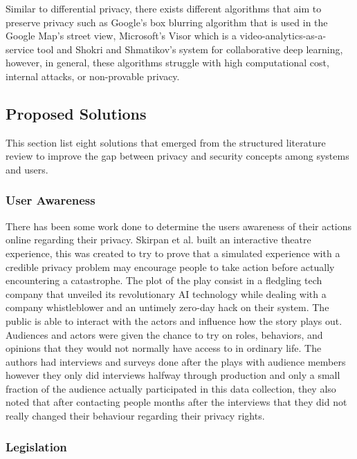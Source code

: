 Similar to differential privacy, there exists different algorithms that aim to
preserve privacy such as Google's box blurring algorithm \cite{FromeLarge}
that is used in the Google Map's street view, Microsoft's Visor \cite{poddar2020visor}
which is a video-analytics-as-a-service tool and Shokri and Shmatikov's
\cite{ShokriPrivacy} system for collaborative deep learning, however, in
general, these algorithms struggle with high computational cost, internal
attacks, or non-provable privacy.

\subsection{Proposed Solutions}

\par This section list eight solutions that emerged from the structured
literature review to improve the gap between privacy and security concepts
among systems and users.

\subsubsection{User Awareness}

There has been some work done to determine the users awareness of their
actions online regarding their privacy. Skirpan et al. \cite{SkirpanPrivacy}
built an interactive theatre experience, this was created to try to prove
that a simulated experience with a credible privacy problem may encourage
people to take action before actually encountering a catastrophe. The plot
of the play consist in a fledgling tech company that unveiled its revolutionary
AI technology while dealing with a company whistleblower and an untimely
zero-day hack on their system. The public is able to interact with the actors
and influence how the story plays out. Audiences and actors were given the
chance to try on roles, behaviors, and opinions that they would not normally
have access to in ordinary life. The authors had interviews and surveys
done after the plays with audience members however they only did interviews
halfway through production and only a small fraction of the audience actually
participated in this data collection, they also noted that after contacting
people months after the interviews that they did not really changed their
behaviour regarding their privacy rights.

\subsubsection{Legislation}

